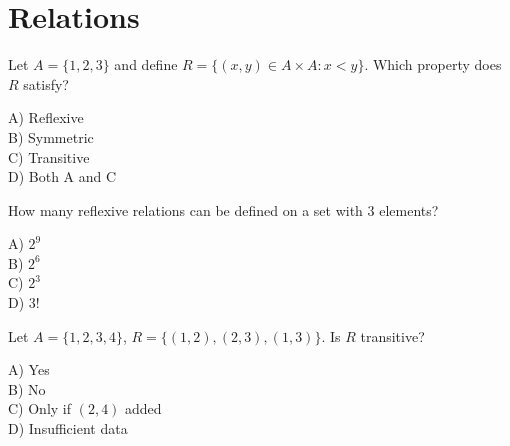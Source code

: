\documentclass[12pt,letterpaper, onecolumn]{exam}
\begin{document}
\section{Relations}
\begin{questions}

\question[3 Marks]
Let \(A = \{1,2,3\}\) and define \(R = \{(x,y)\in A\times A : x < y\}\).  
Which property does \(R\) satisfy?
\begin{multicols}{2}
A) Reflexive\\ B) Symmetric\\ C) Transitive\\ D) Both A and C
\end{multicols}
\droppoints
\answerspace[1.2cm]

\question[3 Marks]
How many reflexive relations can be defined on a set with 3 elements?
\begin{multicols}{2}
A) \(2^9\)\\ B) \(2^6\)\\ C) \(2^3\)\\ D) \(3!\)
\end{multicols}
\droppoints
\answerspace[1.2cm]

\question[4 Marks]
Let \(A = \{1,2,3,4\}\), \(R = \{(1,2),(2,3),(1,3)\}\).  
Is \(R\) transitive?
\begin{multicols}{2}
A) Yes\\ B) No\\ C) Only if \((2,4)\) added\\ D) Insufficient data
\end{multicols}
\droppoints
\answerspace[1.5cm]

\end{questions}

\end{document}

